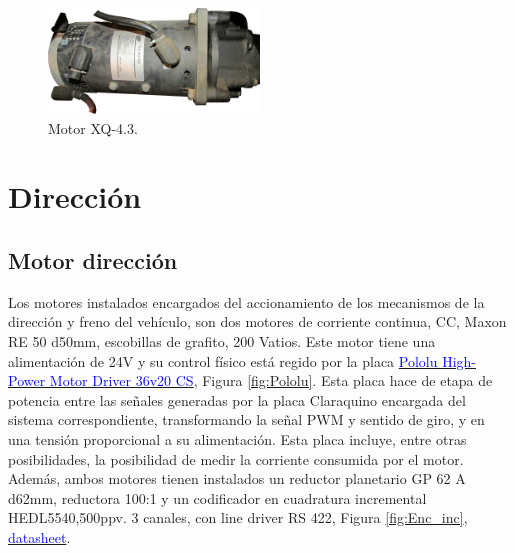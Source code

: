 \begin{figure}[!ht]
	\centering
		\includegraphics[width=0.5\textwidth]{Figuras/C3-Motor_principal.jpg}{		
		\caption{Motor XQ-4.3.}	
		\label{fig:motor_eCARM}}
\end{figure}

\section{Dirección}
\subsection{Motor dirección} \label{Subsec:Maxon}
Los motores instalados encargados del accionamiento de los mecanismos de la dirección y freno del vehículo, son dos motores de corriente continua, CC, Maxon RE 50 d50mm, escobillas de grafito, 200 Vatios. Este motor tiene una alimentación de 24V y su control físico está regido por la placa \href{https://www.pololu.com/product/1457}{\textcolor{blue}{Pololu High-Power Motor Driver 36v20 CS}}, Figura \ref{fig:Pololu}. Esta placa hace de etapa de potencia entre las señales generadas por la placa Claraquino encargada del sistema correspondiente, transformando la señal PWM y sentido de giro, y en una tensión proporcional a su alimentación. Esta placa incluye, entre otras posibilidades, la posibilidad de medir la corriente consumida por el motor. Además, ambos motores tienen instalados un reductor planetario GP 62 A d62mm, reductora 100:1 y un codificador en cuadratura incremental HEDL5540,500ppv. 3 canales, con line driver RS 422, Figura \ref{fig:Enc_inc}, \href{https://github.com/ual-arm/ual-ecar-docs/blob/master/Datasheet/Encoder_HEDL-5540.pdf}{\textcolor{blue}{datasheet}}.

